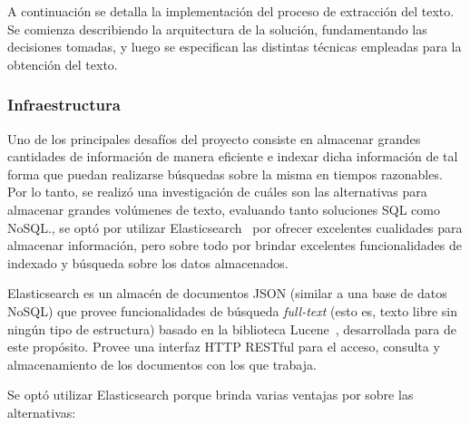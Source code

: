 A continuación se detalla la implementación del proceso de extracción del texto. Se comienza
describiendo la arquitectura de la solución, fundamentando las decisiones tomadas, y luego se
especifican las distintas técnicas empleadas para la obtención del texto.


\subsubsection{Infraestructura}

Uno de los principales desafíos del proyecto consiste en almacenar grandes cantidades de información
de manera eficiente e indexar dicha información de tal forma que puedan realizarse búsquedas sobre
la misma en tiempos razonables. Por lo tanto, se realizó una investigación de cuáles son las
alternativas para almacenar grandes volúmenes de texto, evaluando tanto soluciones SQL como
NoSQL.\@Finalmente, se optó por utilizar Elasticsearch~\cite{Elasitcsearch} por ofrecer excelentes
cualidades para almacenar información, pero sobre todo por brindar excelentes funcionalidades de
indexado y búsqueda sobre los datos almacenados.

Elasticsearch es un almacén de documentos JSON (similar a una base de datos NoSQL) que provee
funcionalidades de búsqueda \textit{full-text} (esto es, texto libre sin ningún tipo de estructura)
basado en la biblioteca Lucene~\cite{Lucene}, desarrollada para de este propósito. Provee una
interfaz HTTP RESTful para el acceso, consulta y almacenamiento de los documentos con los que
trabaja.

Se optó utilizar Elasticsearch porque brinda varias ventajas por sobre las alternativas:


